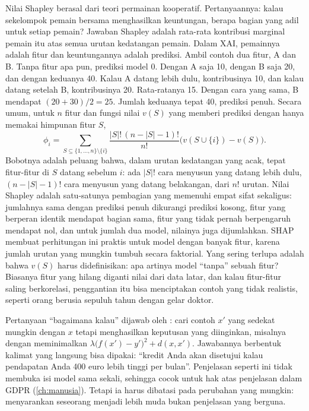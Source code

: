 Nilai Shapley berasal dari teori permainan kooperatif. Pertanyaannya: kalau sekelompok pemain bersama
menghasilkan keuntungan, berapa bagian yang adil untuk setiap pemain? Jawaban Shapley adalah
rata-rata kontribusi marginal pemain itu atas semua urutan kedatangan pemain. Dalam XAI, pemainnya
adalah fitur dan keuntungannya adalah prediksi. Ambil contoh dua fitur, A dan B. Tanpa fitur apa pun,
prediksi model 0. Dengan A saja 10, dengan B saja 20, dan dengan keduanya 40. Kalau A datang lebih
dulu, kontribusinya 10, dan kalau datang setelah B, kontribusinya 20. Rata-ratanya 15. Dengan
cara yang sama, B mendapat $(20+30)/2=25$. Jumlah keduanya tepat 40, prediksi penuh. Secara umum, untuk $n$ fitur dan fungsi nilai $v(S)$ yang memberi prediksi dengan hanya
memakai himpunan fitur $S$,
\begin{equation}
\phi_i=\sum_{S\subseteq\{1,\dots,n\}\setminus\{i\}}\frac{|S|!\,(n-|S|-1)!}{n!}\big(v(S\cup\{i\})-v(S)\big).
\end{equation}
Bobotnya adalah peluang bahwa, dalam urutan kedatangan yang acak, tepat fitur-fitur di $S$ datang sebelum $i$: ada
$|S|!$ cara menyusun yang datang lebih dulu, $(n-|S|-1)!$ cara menyusun yang datang belakangan, dari $n!$ urutan. Nilai
Shapley adalah satu-satunya pembagian yang memenuhi empat sifat sekaligus: jumlahnya sama dengan prediksi penuh
dikurangi prediksi kosong, fitur yang berperan identik mendapat bagian sama, fitur yang tidak pernah berpengaruh
mendapat nol, dan untuk jumlah dua model, nilainya juga dijumlahkan. SHAP \citep{lundberg2017} membuat perhitungan ini
praktis untuk model dengan banyak fitur, karena jumlah urutan yang mungkin tumbuh secara faktorial. Yang sering
terlupa adalah bahwa $v(S)$ harus didefinisikan: apa artinya model ``tanpa'' sebuah fitur? Biasanya fitur yang hilang
diganti nilai dari data latar, dan kalau fitur-fitur saling berkorelasi, penggantian itu bisa menciptakan contoh yang
tidak realistis, seperti orang berusia sepuluh tahun dengan gelar doktor.

Pertanyaan ``bagaimana kalau'' dijawab oleh  \citep{wachter2017}: cari contoh $x'$
yang sedekat mungkin dengan $x$ tetapi menghasilkan keputusan yang diinginkan, misalnya dengan meminimalkan
$\lambda\big(f(x')-y'\big)^2+d(x,x')$. Jawabannya berbentuk kalimat yang langsung bisa dipakai: ``kredit Anda akan
disetujui kalau pendapatan Anda 400 euro lebih tinggi per bulan''. Penjelasan seperti ini tidak membuka isi model sama
sekali, sehingga cocok untuk hak atas penjelasan dalam GDPR (\cref{ch:manusia}). Tetapi ia harus dibatasi pada
perubahan yang mungkin: menyarankan seseorang menjadi lebih muda bukan penjelasan yang berguna.

